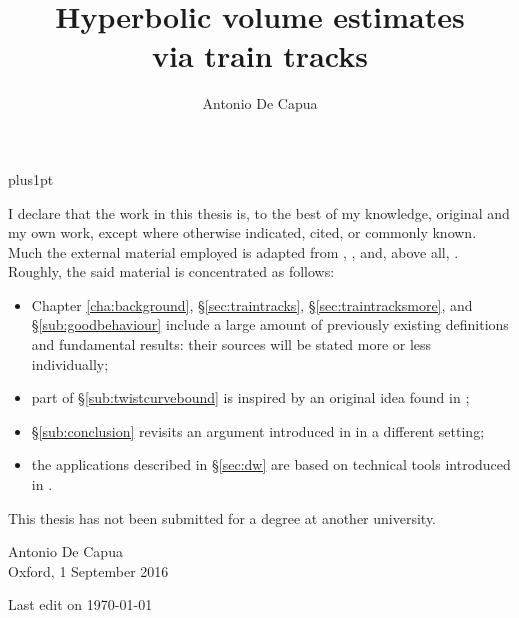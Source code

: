 \documentclass[12pt,twoside,openright]{ociamthesis}
\title{Hyperbolic volume estimates\\ via train tracks}   %
\author{Antonio De Capua}             %
\theoremstyle{plain}
\theoremstyle{nonumberplain}
\theoremstyle{empty}
\theoremstyle{nonumberplain}
\numberwithin{figure}{chapter}
\begin{document}
\baselineskip=18pt plus1pt

\setcounter{secnumdepth}{3}
\setcounter{tocdepth}{3}

\maketitle  

\begin{romanpages}
\begin{originality}
I declare that the work in this thesis is, to the best of my knowledge, original and my own work, except where otherwise indicated, cited, or commonly known. Much the external material employed is adapted from \cite{masurminskyii}, \cite{masurminskyq}, \cite{mosher} and, above all, \cite{mms}.
Roughly, the said material is concentrated as follows:
\begin{itemize}
\item Chapter \ref{cha:background}, \S \ref{sec:traintracks}, \S \ref{sec:traintracksmore}, and \S \ref{sub:goodbehaviour} include a large amount of previously existing definitions and fundamental results: their sources will be stated more or less individually;
\item part of \S \ref{sub:twistcurvebound} is inspired by an original idea found in \cite{masurminskyq};
\item \S \ref{sub:conclusion} revisits an argument introduced in \cite{mms} in a different setting;
\item the applications described in \S \ref{sec:dw} are based on technical tools introduced in \cite{dynnikovwiest}.
\end{itemize}

This thesis has not been submitted for a degree at another university.

\vspace{15ex}

Antonio De Capua\\
Oxford, 1 September 2016
\end{originality}


\begin{acknowledgementslong}

\end{acknowledgementslong}
\begin{abstractlong}

\end{abstractlong}


\tableofcontents{}

\vfill
\noindent\textsf{Last edit on \today}
\end{romanpages}









\newpage
{}

{\small
}
\end{document}
